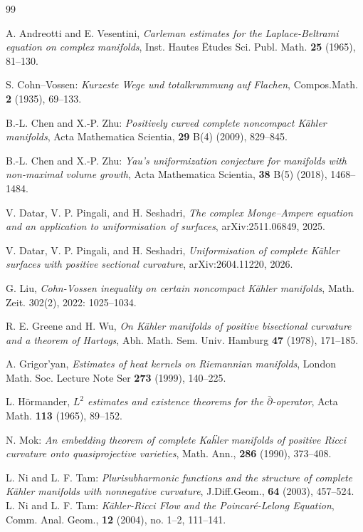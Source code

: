 \documentclass[11pt]{amsart}
\numberwithin{equation}{section}
\theoremstyle{plain}
\theoremstyle{remark}
\begin{document}
\begin{thebibliography}{99}

A. Andreotti and E. Vesentini,
\emph{Carleman estimates for the Laplace-Beltrami equation on complex manifolds},
Inst. Hautes \"Etudes Sci. Publ. Math. \textbf{25} (1965), 81--130.

 S. Cohn--Vossen: {\em Kurzeste Wege und totalkrummung auf Flachen}, {\sc Compos.Math.} {\bf 2} (1935), 69--133.

 B.-L. Chen and X.-P. Zhu: \textit{Positively curved complete noncompact K\"ahler manifolds}, {\sc Acta Mathematica Scientia}, \textbf{29} B(4) (2009), 829–845.

 B.-L. Chen and X.-P. Zhu: \textit{Yau’s uniformization conjecture for manifolds with
 non-maximal volume growth}, {\sc Acta Mathematica Scientia}, \textbf{38} B(5) (2018), 1468–1484.


V. Datar, V. P. Pingali, and H. Seshadri,
\emph{The complex Monge--Ampere equation and an application to uniformisation of surfaces},
arXiv:2511.06849, 2025.

V. Datar, V. P. Pingali, and H. Seshadri,
\emph{Uniformisation of complete K\"ahler surfaces with positive sectional curvature},
arXiv:2604.11220, 2026.

G. Liu,
\emph{Cohn-Vossen inequality on certain noncompact K\"ahler manifolds},
 Math. Zeit. 302(2), 2022: 1025--1034.


R. E. Greene and H. Wu,
\emph{On K\"ahler manifolds of positive bisectional curvature and a theorem of Hartogs},
Abh. Math. Sem. Univ. Hamburg \textbf{47} (1978), 171--185.


A. Grigor’yan,
\emph{Estimates of heat kernels on Riemannian manifolds},
 London Math. Soc. Lecture Note Ser \textbf{273} (1999), 140--225.

L. H\"ormander,
\emph{$L^2$ estimates and existence theorems for the $\bar\partial$-operator},
Acta Math. \textbf{113} (1965), 89--152.

   N. Mok:  {\em An embedding theorem of complete Ka\"hler manifolds of positive Ricci curvature onto quasiprojective varieties}, {\sc Math. Ann.}, {\bf 286} (1990), 373--408.

 L. Ni and L. F. Tam: \textit{Plurisubharmonic functions and the structure of complete
 K\"ahler manifolds with nonnegative curvature}, {\sc J.Diff.Geom.}, \textbf{64} (2003), 457–524.
  L. Ni and L. F. Tam: {\em K\"ahler-Ricci Flow and the Poincar\'e-Lelong Equation}, {\sc Comm. Anal. Geom.}, \textbf{12} (2004), no. 1--2, 111--141.



\end{thebibliography}
\end{document}
